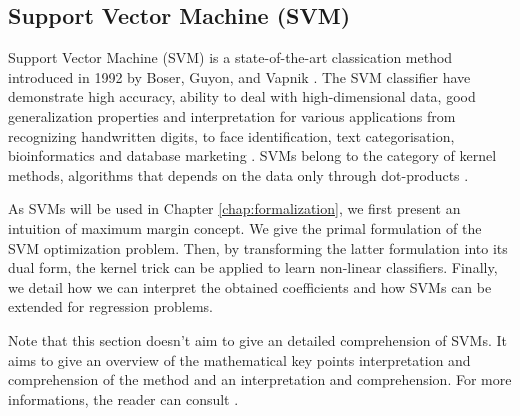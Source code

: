 \subsection{Support Vector Machine (SVM)}

Support Vector Machine (SVM) is a state-of-the-art classication method
introduced in 1992 by Boser, Guyon, and Vapnik \cite{Boser1992,Cortes1995}. The SVM classifier have demonstrate high accuracy, ability to deal with high-dimensional data, good generalization properties and interpretation for various applications from recognizing handwritten digits, to face identification, text categorisation, bioinformatics and database marketing \cite{Campbell2011}. SVMs belong to the category of kernel methods, algorithms that depends on the data only through dot-products \cite{Schlkopf2013}.

As SVMs will be used in Chapter \ref{chap:formalization}, we first present an intuition of maximum margin concept. We give the primal formulation of the SVM optimization problem. Then, by transforming the latter formulation into its dual form, the kernel trick can be applied to learn non-linear classifiers. Finally, we detail how we can interpret the obtained coefficients and how SVMs can be extended for regression problems.

Note that this section doesn't aim to give an detailed comprehension of SVMs. It aims to give an overview of the mathematical key points interpretation and comprehension of the method and an interpretation and comprehension. For more informations, the reader can consult \cite{Schlkopf2013,Campbell2011,Cortes1995}.

